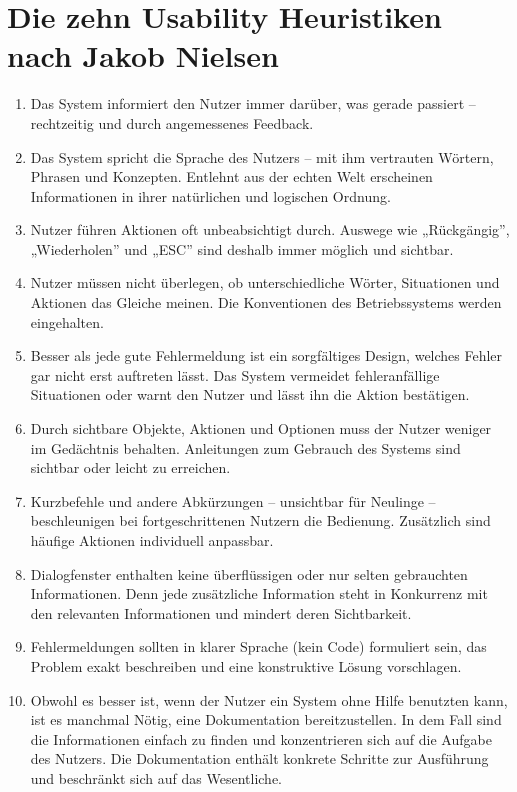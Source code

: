\section{Die zehn Usability Heuristiken nach Jakob Nielsen}
\label{appendix:Heuristiken}
\begin{enumerate}
    \item {\sffamily\color{maincolor}{Sichtbarkeit des Systemstatus}} Das System informiert den
Nutzer immer darüber, was gerade passiert – rechtzeitig und durch angemessenes Feedback.
\item {\sffamily\color{maincolor}{Übereinstimmung von System und Wirklichkeit}} Das System spricht
die Sprache des Nutzers – mit ihm vertrauten Wörtern, Phrasen und Konzepten. Entlehnt aus der echten
Welt erscheinen Informationen in ihrer natürlichen und logischen Ordnung. 
\item {\sffamily\color{maincolor}{Nutzerkontrolle und Freiheit}} Nutzer führen Aktionen oft
unbeabsichtigt durch. Auswege wie „Rückgängig”, „Wiederholen” und „ESC” sind deshalb immer möglich
und sichtbar.  
\item {\sffamily\color{maincolor}{Beständigkeit und Standards}} Nutzer müssen nicht
überlegen, ob unterschiedliche Wörter, Situationen und Aktionen das Gleiche meinen. Die Konventionen
des Betriebssystems werden eingehalten. 
\item {\sffamily\color{maincolor}{Fehlervermeidung}} Besser als jede gute Fehlermeldung
ist ein sorgfältiges Design, welches Fehler gar nicht erst auftreten lässt. Das System vermeidet
fehleranfällige Situationen oder warnt den Nutzer und lässt ihn die Aktion bestätigen.
\item {\sffamily\color{maincolor}{Wiedererkennung statt Erinnerung}} Durch sichtbare Objekte, Aktionen und Optionen muss der
Nutzer weniger im Gedächtnis behalten. Anleitungen zum Gebrauch des Systems sind sichtbar oder
leicht zu erreichen.
\item {\sffamily\color{maincolor}{Flexibilität und Effizienz}} Kurzbefehle und andere Abkürzungen –
unsichtbar für Neulinge – beschleunigen bei fortgeschrittenen Nutzern die Bedienung. Zusätzlich sind
häufige Aktionen individuell anpassbar. 
\item {\sffamily\color{maincolor}{Ästhetisches und minimalistisches Design}} Dialogfenster enthalten
keine überflüssigen oder nur selten gebrauchten Informationen. Denn jede zusätzliche Information
steht in Konkurrenz mit den relevanten Informationen und mindert deren Sichtbarkeit.
\item {\sffamily\color{maincolor}{Hilfestellung beim Erkennen, Bewerten und Beheben von Fehlern }} Fehlermeldungen sollten in klarer Sprache (kein Code) formuliert sein, das Problem exakt beschreiben und eine konstruktive Lösung vorschlagen.
\item {\sffamily\color{maincolor}{Hilfe und Dokumentation }} Obwohl es besser ist, wenn der Nutzer
ein System ohne Hilfe benutzten kann, ist es manchmal Nötig, eine Dokumentation bereitzustellen. In
dem Fall sind die Informationen einfach zu finden und konzentrieren sich auf die Aufgabe des
Nutzers. Die Dokumentation enthält konkrete Schritte zur Ausführung und beschränkt sich auf das
Wesentliche.
\end{enumerate}


